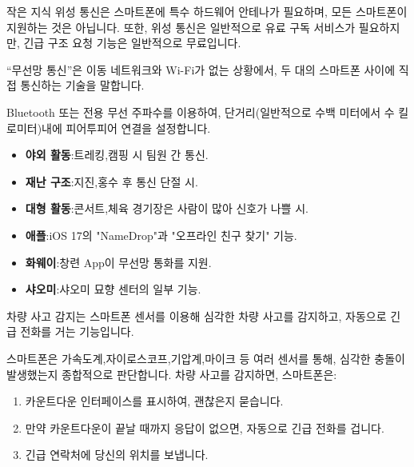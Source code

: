 \begin{tcbinfo}{작은 지식}
위성 통신은 스마트폰에 특수 하드웨어 안테나가 필요하며, 모든 스마트폰이 지원하는 것은 아닙니다. 또한, 위성 통신은 일반적으로 유료 구독 서비스가 필요하지만, 긴급 구조 요청 기능은 일반적으로 무료입니다.

\end{tcbinfo}


“무선망 통신”은 이동 네트워크와 Wi-Fi가 없는 상황에서, 두 대의 스마트폰 사이에 직접 통신하는 기술을 말합니다.


Bluetooth 또는 전용 무선 주파수를 이용하여, 단거리(일반적으로 수백 미터에서 수 킬로미터)내에 피어투피어 연결을 설정합니다.


\begin{itemize}
  \item \textbf{야외 활동}:트레킹,캠핑 시 팀원 간 통신.
  \item \textbf{재난 구조}:지진,홍수 후 통신 단절 시.
  \item \textbf{대형 활동}:콘서트,체육 경기장은 사람이 많아 신호가 나쁠 시.
\end{itemize}


\begin{itemize}
  \item \textbf{애플}:iOS 17의 "NameDrop"과 "오프라인 친구 찾기" 기능.
  \item \textbf{화웨이}:창련 App이 무선망 통화를 지원.
  \item \textbf{샤오미}:샤오미 묘향 센터의 일부 기능.
\end{itemize}


차량 사고 감지는 스마트폰 센서를 이용해 심각한 차량 사고를 감지하고, 자동으로 긴급 전화를 거는 기능입니다.


스마트폰은 가속도계,자이로스코프,기압계,마이크 등 여러 센서를 통해, 심각한 충돌이 발생했는지 종합적으로 판단합니다. 차량 사고를 감지하면, 스마트폰은:

\begin{enumerate}
  \item 카운트다운 인터페이스를 표시하여, 괜찮은지 묻습니다.
  \item 만약 카운트다운이 끝날 때까지 응답이 없으면, 자동으로 긴급 전화를 겁니다.
  \item 긴급 연락처에 당신의 위치를 보냅니다.
\end{enumerate}

